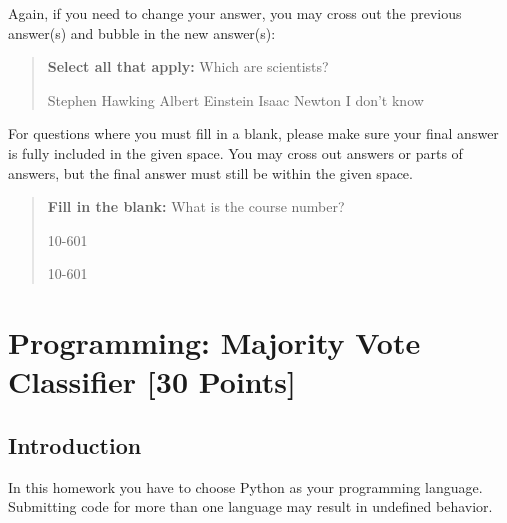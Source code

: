 \documentclass[11pt,addpoints,answers]{exam}
\begin{document}
Again, if you need to change your answer, you may cross out the previous answer(s) and bubble in the new answer(s):

\begin{quote}
\textbf{Select all that apply:} Which are scientists?
    {%
    \checkboxchar{\xcancel{$\blacksquare$}} \checkedchar{$\blacksquare$} %
    \begin{checkboxes}
    \CorrectChoice Stephen Hawking 
    \CorrectChoice Albert Einstein
    \CorrectChoice Isaac Newton
    \choice I don't know
    \end{checkboxes}
    }
\end{quote}

For questions where you must fill in a blank, please make sure your final answer is fully included in the given space. You may cross out answers or parts of answers, but the final answer must still be within the given space.

\begin{quote}
\textbf{Fill in the blank:} What is the course number?

\begin{tcolorbox}[fit,height=1cm, width=4cm, blank, borderline={1pt}{-2pt},nobeforeafter]
    \begin{center}\huge10-601\end{center}
    \end{tcolorbox}\hspace{2cm}
    \begin{tcolorbox}[fit,height=1cm, width=4cm, blank, borderline={1pt}{-2pt},nobeforeafter]
    \begin{center}\huge10-601\end{center}
    \end{tcolorbox}
\end{quote}

\clearpage
\clearpage

\section{Programming: Majority Vote Classifier [30 Points]} 

\subsection{Introduction}

In this homework you have to choose Python as your programming language. Submitting code for more than one language may result in undefined behavior.
\end{document}
